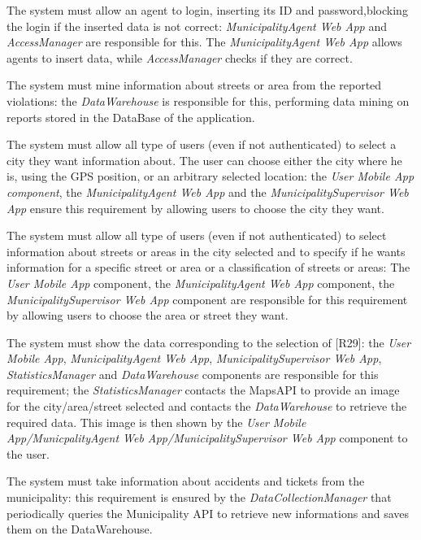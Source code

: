 \documentclass[a4paper]{report}
\begin{document}
\begin{enumerate}[start=1,label={[R\arabic*]}]
\item \label{[R26]}The system must allow an agent to login, inserting its ID and password,blocking the login if the inserted data is not correct: \textit{MunicipalityAgent Web App} and \textit{AccessManager} are responsible for this. The \textit{MunicipalityAgent Web App} allows agents to insert data, while \textit{AccessManager} checks if they are correct.
\item \label{[R27]}The system must mine information about streets or area from the reported violations: the \textit{DataWarehouse} is responsible for this, performing data mining on reports stored in the DataBase of the application.
\item \label{[R28]}The system must allow all type of users (even if not authenticated) to select a city they want information about. The user can choose either the city where he is, using the GPS position, or an arbitrary selected location: the \textit{User Mobile App component}, the \textit{MunicipalityAgent Web App} and the \textit{MunicipalitySupervisor Web App} ensure this requirement by allowing users to choose the city they want.
\item \label{[R29]}The system must allow all type of users (even if not authenticated) to select information about streets or areas in the city selected and to specify if he wants information for a specific street or area or a classification of streets or areas: The \textit{User Mobile App} component, the\textit{ MunicipalityAgent Web App} component, the \textit{MunicipalitySupervisor Web App} component are responsible for this requirement by allowing users to choose the area or street they want.
\item \label{[R30]}The system must show the data corresponding to the selection of [R29]: the \textit{User Mobile App}, \textit{MunicipalityAgent Web App}, \textit{MunicipalitySupervisor Web App}, \textit{StatisticsManager} and \textit{DataWarehouse} components are responsible for this requirement; the \textit{StatisticsManager} contacts the MapsAPI to provide an image for the city/area/street selected and contacts the \textit{DataWarehouse} to retrieve the required data. This image is then shown by the \textit{User Mobile App/MunicpalityAgent Web App/MunicipalitySupervisor Web App} component to the user.
\item \label{[R31]}The system must take information about accidents and tickets from the municipality: this requirement is ensured by the \textit{DataCollectionManager} that periodically queries the Municipality API to retrieve new informations and saves them on the DataWarehouse.

\end{enumerate}
\end{document}
